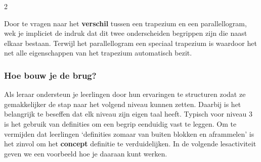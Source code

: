 \begin{multicols}{2}

Door te vragen naar het \textbf{verschil} tussen een trapezium en een parallellogram, wek je impliciet de indruk dat dit twee onderscheiden begrippen zijn die naast elkaar bestaan.
Terwijl het parallellogram een speciaal trapezium is waardoor het net alle eigenschappen van het trapezium automatisch bezit.

\subsubsection*{Hoe bouw je de brug?}
Als leraar ondersteun je leerlingen door hun ervaringen te structuren zodat ze gemakkelijker de stap naar het volgend niveau kunnen zetten.
Daarbij is het belangrijk te beseffen dat elk niveau zijn eigen taal heeft.
Typisch voor niveau 3 is het gebruik van definities om een begrip eenduidig vast te leggen.
Om te vermijden dat leerlingen `definities zomaar van buiten blokken en aframmelen' is het zinvol om het \textbf{concept} definitie te verduidelijken.
In de volgende lesactiviteit geven we een voorbeeld hoe je daaraan kunt werken.
\end{multicols}

